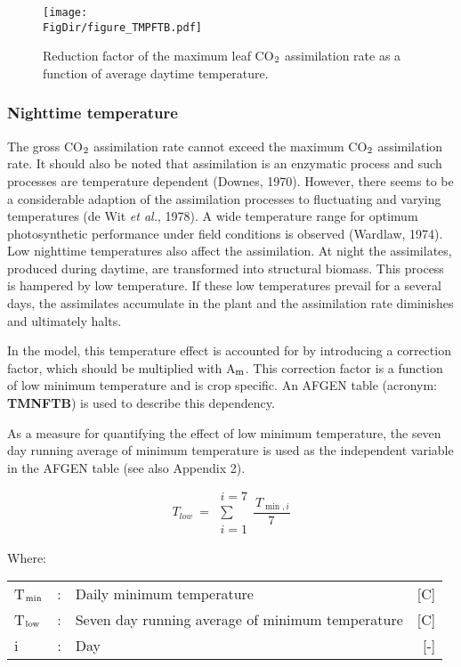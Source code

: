 \begin{figure}[p]
	\centering
	\texttt{[image: \\FigDir/figure\_TMPFTB.pdf]}
	\caption{Reduction factor of the maximum leaf CO$_{{\rm 2}}$ assimilation rate as a function of
		average daytime temperature.}
	\label{fig:TMPFTB}
\end{figure}

\subsubsection{Nighttime temperature}
The gross CO$_{{\rm 2}}$ assimilation rate cannot exceed the maximum CO$_{{\rm 2}}$ assimilation rate. It
should also be noted that assimilation is an enzymatic process and such processes are
temperature dependent (Downes, 1970). However, there seems to be a considerable
adaption of the assimilation processes to fluctuating and varying temperatures (de Wit {\it et
	al.}, 1978). A wide temperature range for optimum photosynthetic performance under field
conditions is observed (Wardlaw, 1974). Low nighttime temperatures also affect the
assimilation. At night the assimilates, produced during daytime, are transformed into
structural biomass. This process is hampered by low temperature. If these low temperatures prevail 
for a several days, the assimilates accumulate in the plant and the assimilation rate diminishes 
and ultimately halts.

In the model, this temperature effect is accounted for by introducing a correction factor,
which should be multiplied with A$_{{\rm m}}$. This correction factor is a function of low minimum
temperature and is crop specific. An AFGEN table (acronym: {\bf TMNFTB}) is used to
describe this dependency.

As a measure for quantifying the effect of low minimum temperature, the seven day
running average of minimum temperature is used as the independent variable in the
AFGEN table (see also Appendix 2).

\begin{equation}
T _{low} ~=~\begin{array}{c}{i=7}  \\
\sum  \\
{i=1}\end{array}{\frac{\, T _{\min ,i} }{7}}
\end{equation}

Where:\\[5pt]
\begin{tabularx}{\textwidth}{llXr}
	T$_{{\rm min}}$  &:& Daily minimum temperature   &     [\degrees C]\\
	T$_{{\rm low}}$ &:& Seven day running average of minimum temperature    &    [\degrees C]\\
	i &:& Day    &    [-]
\end{tabularx}


